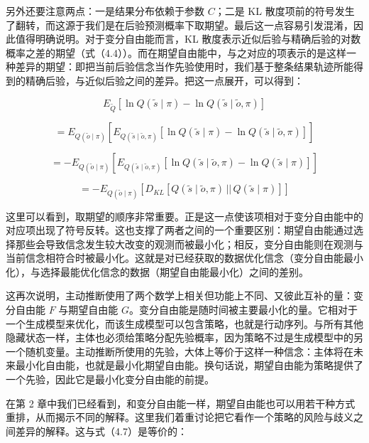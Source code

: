 另外还要注意两点：一是结果分布依赖于参数 $C$；二是 KL 散度项前的符号发生了翻转，而这源于我们是在后验预测概率下取期望。最后这一点容易引发混淆，因此值得明确说明。对于变分自由能而言，KL 散度表示近似后验与精确后验的对数概率之差的期望（式（4.4））。而在期望自由能中，与之对应的项表示的是这样一种差异的期望：即把当前后验信念当作先验使用时，我们基于整条结果轨迹所能得到的精确后验，与近似后验之间的差异。把这一点展开，可以得到：

\begin{equation}
E_{\tilde{Q}}\!\left[\ln Q(\tilde{s} \mid \pi) - \ln Q(\tilde{s} \mid \tilde{o}, \pi)\right]
\tag{4.8}
\end{equation}

\begin{equation}
= E_{Q(\tilde{o} \mid \pi)}\!\left[
E_{Q(\tilde{s} \mid \tilde{o}, \pi)}\!\left[
\ln Q(\tilde{s} \mid \pi) - \ln Q(\tilde{s} \mid \tilde{o}, \pi)
\right]\right]
\tag{4.8}
\end{equation}

\begin{equation}
= -E_{Q(\tilde{o} \mid \pi)}\!\left[
E_{Q(\tilde{s} \mid \tilde{o}, \pi)}\!\left[
\ln Q(\tilde{s} \mid \tilde{o}, \pi) - \ln Q(\tilde{s} \mid \pi)
\right]\right]
\tag{4.8}
\end{equation}

\begin{equation}
= -E_{Q(\tilde{o} \mid \pi)}\!\left[
D_{KL}\!\left[Q(\tilde{s} \mid \tilde{o}, \pi)\,||\,Q(\tilde{s} \mid \pi)\right]\right]
\tag{4.8}
\end{equation}

这里可以看到，取期望的顺序非常重要。正是这一点使该项相对于变分自由能中的对应项出现了符号反转。这也支撑了两者之间的一个重要区别：期望自由能通过选择那些会导致信念发生较大改变的观测而被最小化；相反，变分自由能则在观测与当前信念相符合时被最小化。这就是对已经获取的数据优化信念（变分自由能最小化），与选择最能优化信念的数据（期望自由能最小化）之间的差别。

这再次说明，主动推断使用了两个数学上相关但功能上不同、又彼此互补的量：变分自由能 $F$ 与期望自由能 $G$。变分自由能是随时间被主要最小化的量。它相对于一个生成模型来优化，而该生成模型可以包含策略，也就是行动序列。与所有其他隐藏状态一样，主体也必须给策略分配先验概率，因为策略不过是生成模型中的另一个随机变量。主动推断所使用的先验，大体上等价于这样一种信念：主体将在未来最小化自由能，也就是最小化期望自由能。换句话说，期望自由能为策略提供了一个先验，因此它是最小化变分自由能的前提。

在第 2 章中我们已经看到，和变分自由能一样，期望自由能也可以用若干种方式重排，从而揭示不同的解释。这里我们着重讨论把它看作一个策略的风险与歧义之间差异的解释。这与式（4.7）是等价的：

